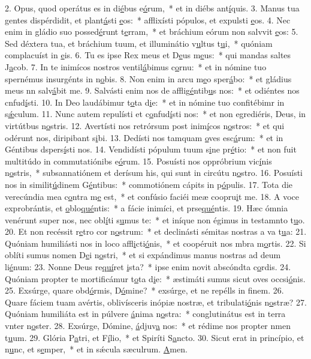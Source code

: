 2. Opus, quod operátus es in di\uline{é}bus e\uline{ó}rum,~* et in diébs ant\uline{í}quis.
3. Manus tua gentes dispérdidit, et plant\uline{á}sti \uline{e}os:~* afflixísti pópulos, et expulsti \uline{e}os.
4. Nec enim in gládio suo possed\uline{é}runt t\uline{e}rram,~* et bráchium eórum non salvvit \uline{e}os:
5. Sed déxtera tua, et bráchium tuum, et illuminátio v\uline{u}ltus t\uline{u}i,~* quóniam complacuíst in \uline{e}is.
6. Tu es ipse Rex meus et D\uline{e}us m\uline{e}us:~* qui mandas saltes J\uline{a}cob.
7. In te inimícos nostros ventil\uline{á}bimus c\uline{o}rnu:~* et in nómine tuo spernémus insurgénts in n\uline{o}bis.
8. Non enim in arcu m\uline{e}o sper\uline{á}bo:~* et gládius meus nn salv\uline{á}bit me.
9. Salvásti enim nos de afflig\uline{é}ntib\uline{u}s nos:~* et odiéntes nos cnfud\uline{í}sti.
10. In Deo laudábimur t\uline{o}ta d\uline{i}e:~* et in nómine tuo confitébimr in s\uline{ǽ}culum.
11. Nunc autem repulísti et c\uline{o}nfud\uline{í}sti nos:~* et non egrediéris, Deus, in virtútbus n\uline{o}stris.
12. Avertísti nos retrórsum post inim\uline{í}cos n\uline{o}stros:~* et qui odérunt nos, diripibant s\uline{i}bi.
13. Dedísti nos tamquam \uline{o}ves esc\uline{á}rum:~* et in Géntibus dspers\uline{í}sti nos.
14. Vendidísti pópulum tuum s\uline{i}ne pr\uline{é}tio:~* et non fuit multitúdo in commutatiónibs e\uline{ó}rum.
15. Posuísti nos oppróbrium vic\uline{í}nis n\uline{o}stris,~* subsannatiónem et derísum his, qui sunt in circútu n\uline{o}stro.
16. Posuísti nos in similit\uline{ú}dinem G\uline{é}ntibus:~* commotiónem cápits in p\uline{ó}pulis.
17. Tota die verecúndia mea c\uline{o}ntra m\uline{e} est,~* et confúsio faciéi meæ coopru\uline{i}t me.
18. A voce exprobrántis, et \uline{o}blo\uline{qué}ntis:~* a fácie inimíci, et prse\uline{qué}ntis.
19. Hæc ómnia venérunt super nos, nec obl\uline{í}ti s\uline{u}mus te:~* et iníque non égimus in testamnto t\uline{u}o.
20. Et non recéssit r\uline{e}tro cor n\uline{o}strum:~* et declinásti sémitas nostras a va t\uline{u}a:
21. Quóniam humiliásti nos in loco affl\uline{i}cti\uline{ó}nis,~* et coopéruit nos mbra m\uline{o}rtis.
22. Si oblíti sumus nomen D\uline{e}i n\uline{o}stri,~* et si expándimus manus nostras ad deum li\uline{é}num:
23. Nonne Deus re\uline{quí}ret \uline{i}sta?~* ipse enim novit abscóndta c\uline{o}rdis.
24. Quóniam propter te mortificámur t\uline{o}ta d\uline{i}e:~* æstimáti sumus sicut oves occsi\uline{ó}nis.
25. Exsúrge, quare obd\uline{ó}rmis, D\uline{ó}mine?~* exsúrge, et ne repélls in f\uline{i}nem.
26. Quare fáciem tuam avértis, oblivísceris inópiæ nostræ, et tribulati\uline{ó}nis n\uline{o}stræ?
27. Quóniam humiliáta est in púlvere \uline{á}nima n\uline{o}stra:~* conglutinátus est in terra vnter n\uline{o}ster.
28. Exsúrge, Dómine, \uline{á}djuv\uline{a} nos:~* et rédime nos propter nmen t\uline{u}um.
29. Glória P\uline{a}tri, et F\uline{í}lio,~* et Spiríti S\uline{a}ncto.
30. Sicut erat in princípio, et n\uline{u}nc, et s\uline{e}mper,~* et in sǽcula sæculrum. \uline{A}men.
